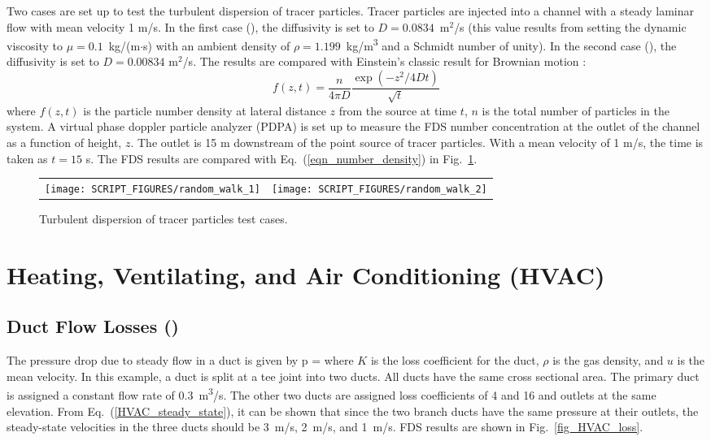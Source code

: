 \documentclass[11pt]{book}
\begin{document}
Two cases are set up to test the turbulent dispersion of tracer particles.  Tracer particles are injected into a channel with a steady laminar flow with mean velocity 1 m/s.  In the first case (), the diffusivity is set to $D=0.0834$~m$^2$/s (this value results from setting the dynamic viscosity to $\mu = 0.1$~kg/(m$\cdot$s) with an ambient density of $\rho=1.199$~\si{kg/m^3} and a Schmidt number of unity).  In the second case (), the diffusivity is set to $D=0.00834$ m$^2$/s.  The results are compared with Einstein's classic result for Brownian motion \cite{Gardiner:2004}:
\begin{equation}
\label{eqn_number_density}
f(z,t) = \frac{n}{4\pi D} \frac{\exp \left( -z^2/4Dt \right)}{\sqrt{t}}
\end{equation}
where $f(z,t)$ is the particle number density at lateral distance $z$ from the source at time $t$, $n$ is the total number of particles in the system.  A virtual phase doppler particle analyzer (PDPA) is set up to measure the FDS number concentration at the outlet of the channel as a function of height, $z$.  The outlet is 15 m downstream of the point source of tracer particles.  With a mean velocity of 1 m/s, the time is taken as $t = 15$ s.  The FDS results are compared with Eq.~(\ref{eqn_number_density}) in Fig.~\ref{random_walk_fig}.

\begin{figure}[ht]
\begin{tabular*}{\textwidth}{lr}
\texttt{[image: SCRIPT\_FIGURES/random\_walk\_1]} &
\texttt{[image: SCRIPT\_FIGURES/random\_walk\_2]}
\end{tabular*}
\caption[Turbulent dispersion of tracer particles]{Turbulent dispersion of tracer particles  test cases.}
\label{random_walk_fig}
\end{figure}




\chapter{Heating, Ventilating, and Air Conditioning (HVAC)}

\section{Duct Flow Losses (\texorpdfstring{}{HVAC\_flow\_loss})}
\label{HVAC_flow_loss}

The pressure drop due to steady flow in a duct is given by
\be
\Delta p =   \label {HVAC_steady_state}
\ee
where $K$ is the loss coefficient for the duct, $\rho$ is the gas density, and $u$ is the mean velocity. In this example, a duct is split at a tee joint into two ducts. All ducts have the same cross sectional area.  The primary duct is assigned a constant flow rate of 0.3~\si{m^3/s}.  The other two ducts are assigned loss coefficients of 4 and 16 and outlets at the same elevation.  From Eq.~(\ref{HVAC_steady_state}), it can be shown that since the two branch ducts have the same pressure at their outlets, the steady-state velocities in the three ducts should be 3~m/s, 2~m/s, and 1~m/s.  FDS results are shown in Fig.~\ref{fig_HVAC_loss}.
\end{document}
